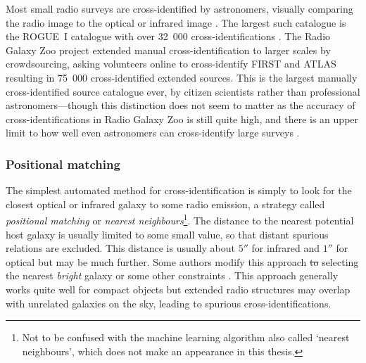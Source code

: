 \documentclass[11pt, a4paper]{book}
\newcommand{\defn}[1]{\emph{#1}}
\providecommand{\DIFaddtex}[1]{{\protect\color{blue}\uwave{#1}}} %
\providecommand{\DIFdeltex}[1]{{\protect\color{red}\sout{#1}}}                      %
\providecommand{\DIFaddbegin}{} %
\providecommand{\DIFaddend}{} %
\providecommand{\DIFdelbegin}{} %
\providecommand{\DIFdelend}{} %
\providecommand{\DIFadd}[1]{\texorpdfstring{\DIFaddtex{#1}}{#1}} %
\providecommand{\DIFdel}[1]{\texorpdfstring{\DIFdeltex{#1}}{}} %
\newcommand{\DIFscaledelfig}{0.5}
\newlength{\DIFdelgraphicswidth} %
\newlength{\DIFdelgraphicsheight} %
\newcommand{\DIFaddincludegraphics}[2][]{{\color{blue}\fbox{\DIFOincludegraphics[#1]{#2}}}} %
\newcommand{\DIFdelincludegraphics}[2][]{%
\sbox{\DIFdelgraphicsbox}{\DIFOincludegraphics[#1]{#2}}%
\settoboxwidth{\DIFdelgraphicswidth}{\DIFdelgraphicsbox} %
\settoboxtotalheight{\DIFdelgraphicsheight}{\DIFdelgraphicsbox} %
\scalebox{\DIFscaledelfig}{%
\parbox[b]{\DIFdelgraphicswidth}{\usebox{\DIFdelgraphicsbox}\\[-\baselineskip] \rule{\DIFdelgraphicswidth}{0em}}\llap{\resizebox{\DIFdelgraphicswidth}{\DIFdelgraphicsheight}{%
\setlength{\unitlength}{\DIFdelgraphicswidth}%
\begin{picture}(1,1)%
\thicklines\linethickness{2pt} %
{\color[rgb]{1,0,0}\put(0,0){\framebox(1,1){}}}%
{\color[rgb]{1,0,0}\put(0,0){\line( 1,1){1}}}%
{\color[rgb]{1,0,0}\put(0,1){\line(1,-1){1}}}%
\end{picture}%
}\hspace*{3pt}}} %
} %
\DeclareRobustCommand{\DIFaddbegin}{\DIFOaddbegin \let\includegraphics\DIFaddincludegraphics} %
\DeclareRobustCommand{\DIFaddend}{\DIFOaddend \let\includegraphics\DIFOincludegraphics} %
\DeclareRobustCommand{\DIFdelbegin}{\DIFOdelbegin \let\includegraphics\DIFdelincludegraphics} %
\DeclareRobustCommand{\DIFdelend}{\DIFOaddend \let\includegraphics\DIFOincludegraphics} %
\begin{document}
        \begin{sloppypar}
        Most small radio surveys are cross-identified by astronomers, visually comparing the radio image to the optical or infrared image \citep[e.g.][]{norris06,middelberg08}. The largest such catalogue is the ROGUE~I catalogue with over 32~000 cross-identifications \citep{zywucka_catalogue_2020}. The Radio Galaxy Zoo project \citep{banfield15} extended manual cross-identification to larger scales by crowdsourcing, asking volunteers online to cross-identify FIRST and ATLAS resulting in 75~000 cross-identified extended sources. This is the largest manually cross-identified source catalogue ever, by citizen scientists rather than professional astronomers---though this distinction does not seem to matter as the accuracy of cross-identifications in Radio Galaxy Zoo is still quite high, and there is an upper limit to how well even astronomers can cross-identify large surveys \citep{wong21rgz,banfield15}.
        \end{sloppypar}

        \subsubsection{Positional matching}
        \label{sec:xid-posmatch}

            The simplest automated method for cross-identification is simply to look for the closest optical or infrared galaxy to some radio emission, a strategy called \defn{positional matching} or \defn{nearest neighbours}\footnote{Not to be confused with the machine learning algorithm also called `nearest neighbours', which does not make an appearance in this thesis.}. The distance to the nearest potential host galaxy is usually limited to some small value, so that distant spurious relations are excluded. This distance is usually about $5''$ for infrared and $1''$ for optical but may be much further. Some authors modify this approach \DIFdelbegin \DIFdel{to }\DIFdelend \DIFaddbegin \DIFadd{by }\DIFaddend selecting the nearest \emph{bright} galaxy or \DIFaddbegin \DIFadd{adding }\DIFaddend some other constraints \citep[e.g.][]{kimball08}. This approach generally works quite well for compact objects but extended radio structures may overlap with unrelated galaxies on the sky, leading to spurious cross-identifications.
\end{document}
